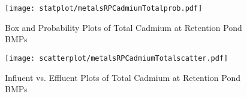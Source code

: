         \begin{figure}[hb]   %
            \centering
            \texttt{[image: statplot/metalsRPCadmiumTotalprob.pdf]}
            \caption{Box and Probability Plots of Total Cadmium at Retention Pond BMPs}
        \end{figure}         %
        
        
        \begin{figure}[hb]   %
            \centering
            \texttt{[image: scatterplot/metalsRPCadmiumTotalscatter.pdf]}
            \caption{Influent vs. Effluent Plots of Total Cadmium at Retention Pond BMPs}
        \end{figure}         %
        \clearpage
        